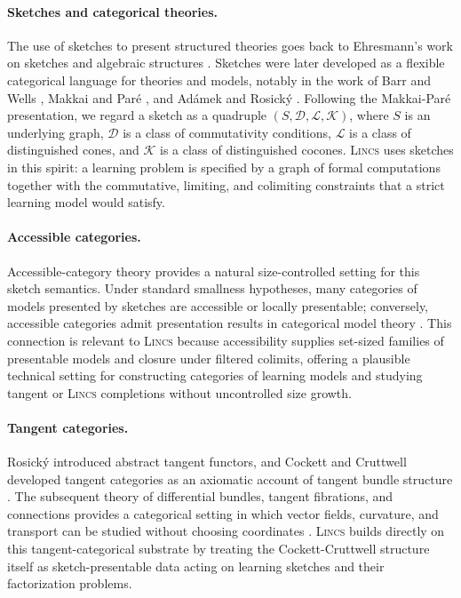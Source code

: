 \documentclass{article}
\begin{document}
\paragraph{Sketches and categorical theories.}
The use of sketches to present structured theories goes back to Ehresmann's work on sketches and algebraic structures \citep{ehresmann1968esquisses}. Sketches were later developed as a flexible categorical language for theories and models, notably in the work of Barr and Wells \citep{barr1999category}, Makkai and Par{\'e} \citep{makkai1989accessible}, and Ad{\'a}mek and Rosick{\'y} \citep{adamek1994locally}. Following the Makkai-Par{\'e} presentation, we regard a sketch as a quadruple \((S,\mathcal D,\mathcal L,\mathcal K)\), where \(S\) is an underlying graph, \(\mathcal D\) is a class of commutativity conditions, \(\mathcal L\) is a class of distinguished cones, and \(\mathcal K\) is a class of distinguished cocones. \textsc{Lincs}   uses sketches in this spirit: a learning problem is specified by a graph of formal computations together with the commutative, limiting, and colimiting constraints that a strict learning model would satisfy.

\paragraph{Accessible categories.}
Accessible-category theory provides a natural size-controlled setting for this
sketch semantics.  Under standard smallness hypotheses, many categories of
models presented by sketches are accessible or locally presentable; conversely,
accessible categories admit presentation results in categorical model theory
\citep{makkai1989accessible,adamek1994locally}.  This connection is relevant to
\textsc{Lincs}   because accessibility supplies set-sized families of presentable models
and closure under filtered colimits, offering a plausible technical setting for
constructing categories of learning models and studying tangent or \textsc{Lincs}  
completions without uncontrolled size growth.

\paragraph{Tangent categories.}
Rosick{\'y} introduced abstract tangent functors, and Cockett and Cruttwell developed tangent categories as an axiomatic account of tangent bundle structure \citep{rosicky1984abstract,cockett2014tangent}. The subsequent theory of differential bundles, tangent fibrations, and connections provides a categorical setting in which vector fields, curvature, and transport can be studied without choosing coordinates \citep{cockett2016differential,cockett2017connections}. \textsc{Lincs}   builds directly on this tangent-categorical substrate by treating the Cockett-Cruttwell structure itself as sketch-presentable data acting on learning sketches and their factorization problems.
\end{document}
